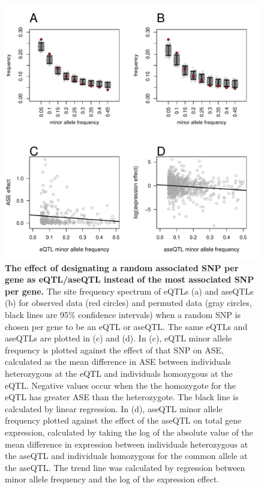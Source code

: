 \begin{figure}[h!]
      \centering
       \includegraphics[width=\linewidth]{Ch3FigS4}
    \caption{\textbf{The effect of designating a random associated SNP per gene as eQTL/aseQTL instead of the most associated SNP per gene.} The site frequency spectrum of eQTLs (a) and aseQTLs (b) for observed data (red circles) and permuted data (gray circles, black lines are 95\% confidence intervals) when a random SNP is chosen per gene to be an eQTL or aseQTL. The same eQTLs and aseQTLs are plotted in (c) and (d). In (c), eQTL minor allele frequency is plotted against the effect of that SNP on ASE, calculated as the mean difference in ASE between individuals heterozygous at the eQTL and individuals homozygous at the eQTL. Negative values occur when the the homozygote for the eQTL has greater ASE than the heterozygote. The black line is calculated by linear regression. In (d), aseQTL minor allele frequency plotted against the effect of the aseQTL on total gene expression, calculated by taking the log of the absolute value of the mean difference in expression between individuals heterozygous at the aseQTL and individuals homozygous for the common allele at the aseQTL. The trend line was calculated by regression between minor allele frequency and the log of the expression effect. }
    \label{fig:3figS4}
\end{figure}

